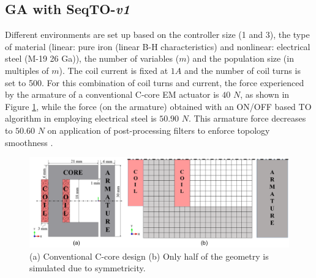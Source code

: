 \subsection{GA with SeqTO-\textit{v1}}

Different environments are set up based on the controller size (1 and 3), the type of material (linear: pure iron (linear B-H characteristics) and nonlinear: electrical steel (M-19 26 Ga)), the number of variables ($m$) and the population size (in multiples of $m$). The coil current is fixed at $1 A$ and the number of coil turns is set to 500. For this combination of coil turns and current, the force experienced by the armature of a conventional C-core EM actuator is $40 \hspace{4pt} N$, as shown in Figure \ref{fig:MDP_c_core_conventional_latex}, while the force (on the armature) obtained with an ON/OFF based TO algorithm in \parencite{midha2019selection, park2009} employing electrical steel is $50.90 \hspace{4pt} N$. This armature force decreases to $50.60 \hspace{4pt} N$ on application of post-processing filters to enforce topology smoothness \parencite{midha2019selection}.

\begin{figure}[h!]
    \centering
    \includegraphics[width=\textwidth]{Figures/Ch_RL/c_core_conventional_latex.png}
    \caption{(a) Conventional C-core design (b) Only half of the geometry is simulated due to symmetricity.}
    \label{fig:MDP_c_core_conventional_latex}
\end{figure}


